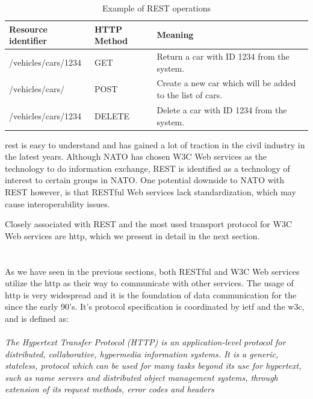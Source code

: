  \begin{table}[h]
 \begin{tabularx}{\textwidth}{| X | X | X |}
 \hline
   \textbf{Resource identifier} & \textbf{HTTP Method}  & \textbf{Meaning}\\ \hline
   /vehicles/cars/1234 & GET & Return a car with ID 1234 from the system. \\ \hline
   /vehicles/cars/ & POST & Create a new car which will be added to the list of cars. \\ \hline
   /vehicles/cars/1234 & DELETE & Delete a car with ID 1234 from the system. \\ \hline
 \end{tabularx}
 \caption{Example of REST operations}
 \label{table-rest}
 \end{table}

 \gls{rest} is easy to understand and has gained a lot of traction in the civil
 industry in the latest years. Although NATO has chosen W3C Web services as the
 technology to do information exchange, REST is identified as a technology of
 interest to certain groups in
 NATO\cite{johnsen-bloebaum-recommendations-web-services-tactical-domain}. One
 potential downside to NATO with REST however, is that RESTful Web services lack
 standardization, which may cause interoperability issues.

Closely associated with REST and the most used transport protocol for W3C Web
services are \gls{http}, which we present in detail in the next section.


\section{}

As we have seen in the previous sections, both RESTful and W3C Web services
utilize the \gls{http} as their way to communicate with other services. The
usage of \gls{http} is very widespread and it is the foundation of data
communication for the  since the early 90's. It's protocol
specification is coordinated by \gls{ietf} and the \gls{w3c}, and is defined
as\cite{rfc-2616}:

\paragraph{}
\textit{
    The Hypertext Transfer Protocol (HTTP) is an application-level
    protocol for distributed, collaborative, hypermedia information
    systems. It is a generic, stateless, protocol which can be used for
    many tasks beyond its use for hypertext, such as name servers and
    distributed object management systems, through extension of its
    request methods, error codes and headers
}

